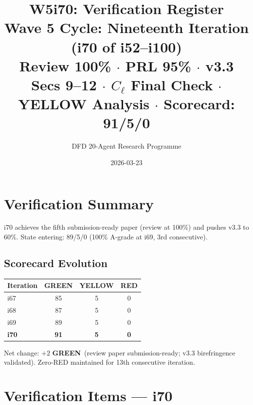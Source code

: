 \documentclass[11pt,a4paper]{article}
\title{\Large W5i70: Verification Register\\[6pt]
\normalsize Wave 5 Cycle: Nineteenth Iteration (i70 of i52--i100)\\[6pt]
Review 100\% $\cdot$ PRL 95\% $\cdot$ v3.3 Secs 9--12 $\cdot$ $C_\ell$ Final Check $\cdot$ YELLOW Analysis $\cdot$ Scorecard: 91/5/0}
\author{DFD 20-Agent Research Programme}
\date{2026-03-23}
\newcommand{\GREEN}{\textcolor{dfdgreen}{\textbf{GREEN}}}
\begin{document}
\maketitle

\section{Verification Summary}

i70 achieves the fifth submission-ready paper (review at 100\%) and pushes v3.3 to 60\%. State entering: 89/5/0 (100\% A-grade at i69, 3rd consecutive).

\subsection{Scorecard Evolution}

\begin{center}
\begin{tabular}{lccc}
\toprule
\textbf{Iteration} & \textbf{GREEN} & \textbf{YELLOW} & \textbf{RED} \\
\midrule
i67 & 85 & 5 & 0 \\
i68 & 87 & 5 & 0 \\
i69 & 89 & 5 & 0 \\
\textbf{i70} & \textbf{91} & \textbf{5} & \textbf{0} \\
\bottomrule
\end{tabular}
\end{center}

Net change: $+2$ \GREEN\ (review paper submission-ready; v3.3 birefringence validated). Zero-RED maintained for 13th consecutive iteration.

\section{Verification Items --- i70}
\end{document}
